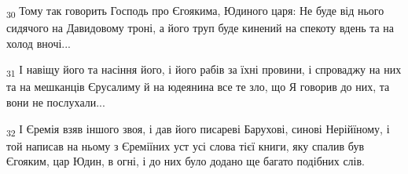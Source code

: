 \begin{tcolorbox}
\textsubscript{30} Тому так говорить Господь про Єгоякима, Юдиного царя: Не буде від нього сидячого на Давидовому троні, а його труп буде кинений на спекоту вдень та на холод вночі...
\end{tcolorbox}
\begin{tcolorbox}
\textsubscript{31} І навіщу його та насіння його, і його рабів за їхні провини, і спроваджу на них та на мешканців Єрусалиму й на юдеянина все те зло, що Я говорив до них, та вони не послухали...
\end{tcolorbox}
\begin{tcolorbox}
\textsubscript{32} І Єремія взяв іншого звоя, і дав його писареві Барухові, синові Нерійїному, і той написав на ньому з Єреміїних уст усі слова тієї книги, яку спалив був Єгояким, цар Юдин, в огні, і до них було додано ще багато подібних слів.
\end{tcolorbox}

